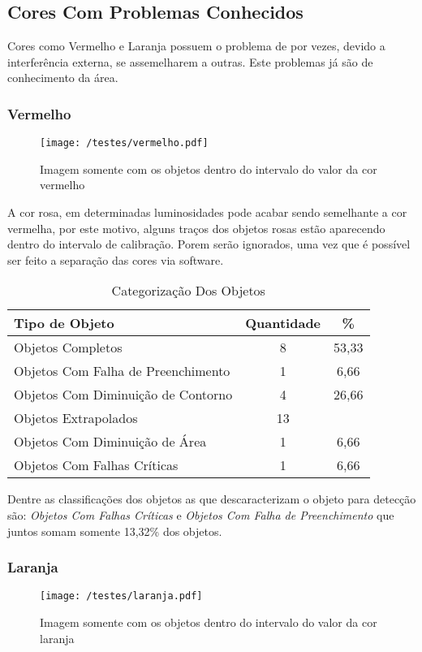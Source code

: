 \subsection{Cores Com Problemas Conhecidos}
Cores como Vermelho e Laranja possuem o problema de por vezes, devido a interferência externa, se assemelharem a outras. Este problemas já são de conhecimento da área.
	
	
\subsubsection{Vermelho}
	\begin{figure}[H]
		\centering
		\texttt{[image: /testes/vermelho.pdf]}
		\caption{Imagem somente com os objetos dentro do intervalo do valor da cor vermelho}
		\label{disposicaoparte}
	\end{figure}

A cor rosa, em determinadas luminosidades pode acabar sendo semelhante a cor vermelha, por este motivo, alguns traços dos objetos rosas estão aparecendo dentro do intervalo de calibração. Porem serão ignorados, uma vez que é possível ser feito a separação das cores via software.	

	
	\begin{table}[h]
\centering
\begin{tabular}{l|c|c}
Tipo de Objeto & Quantidade  & \% \\ %
\hline                               %
Objetos Completos &  8 & 53,33 \\
\hline 
Objetos Com Falha de Preenchimento & 1 & 6,66 \\
\hline 
Objetos Com Diminuição de Contorno &  4 & 26,66 \\
\hline 
Objetos Extrapolados &  13 \\
\hline 
Objetos Com Diminuição de Área &  1 &6,66 \\
\hline 
Objetos Com Falhas Críticas &  1 & 6,66\\
\hline 
\end{tabular}
\caption{Categorização Dos Objetos}
\end{table}

Dentre as classificações dos objetos as que 
descaracterizam o objeto para detecção são: \textit{Objetos Com Falhas Críticas} e \textit{Objetos Com Falha de Preenchimento} que juntos somam somente 13,32\% dos objetos.

\subsubsection{Laranja}
	\begin{figure}[H]
		\centering
		\texttt{[image: /testes/laranja.pdf]}
		\caption{Imagem somente com os objetos dentro do intervalo do valor da cor laranja}
		\label{disposicaoparte}
	\end{figure}
	
